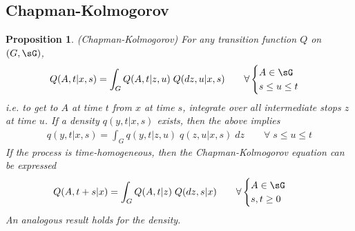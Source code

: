 \documentclass[12pt]{article}
\theoremstyle{plain}
\newtheorem{prop}[thm]{Proposition}
\theoremstyle{definition}
\theoremstyle{remark}
\begin{document}
\clearpage
\subsection{Chapman-Kolmogorov}

\begin{prop}\emph{(Chapman-Kolmogorov)}
For any transition function $Q$ on $(G,\sG)$,
\begin{align*}
  Q(A,t|x,s)
  =
  \int_{G}
  Q(A,t|z,u)
  \;
  Q(dz,u|x,s)
  \qquad
  \forall
  \begin{cases}
    A\in\sG \\
    s\leq u\leq t
  \end{cases}
\end{align*}
i.e. to get to $A$ at time $t$ from $x$ at time $s$, integrate over
all intermediate stops $z$ at time $u$.
If a density $q(y,t|x,s)$ exists, then the above implies
\begin{align*}
  q(y,t|x,s)
  =
  \int_{G}
  q(y,t|z,u)
  \;
  q(z,u|x,s)
  \;dz
  \qquad
  \forall\;
  s\leq u\leq t
\end{align*}
If the process is time-homogeneous, then the Chapman-Kolmogorov equation
can be expressed
\begin{align}
  Q(A,t+s|x)
  &=
  \int_{G}
  Q(A,t|z)
  \;
  Q(dz,s|x)
  \qquad
  \forall
  \begin{cases}
    A\in\sG \\
    s,t\geq 0
  \end{cases}
  \label{chapmankolmogorovhomog}
\end{align}
An analogous result holds for the density.
\end{prop}
\end{document}
